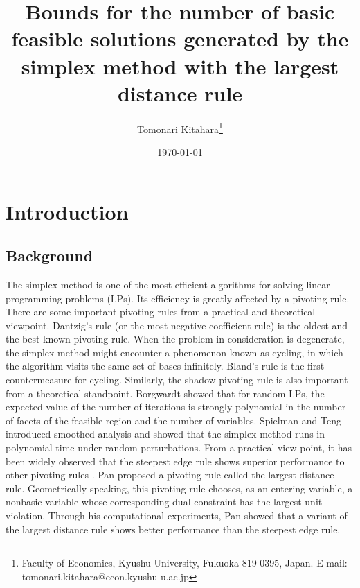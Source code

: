 \documentclass[12pt]{article}
\title{Bounds for the number of basic feasible solutions generated by the simplex method with the largest distance rule}
\author{Tomonari Kitahara\footnote{Faculty of Economics, Kyushu University, Fukuoka 819-0395, Japan. E-mail: tomonari.kitahara@econ.kyushu-u.ac.jp}}
\date{\today}
\begin{document}
\maketitle
{}
\section{Introduction}
\subsection{Background}
The simplex method is one of the most efficient algorithms for solving linear programming problems (LPs). 
Its efficiency is greatly affected by a pivoting rule. 
There are some important pivoting rules from a practical and theoretical viewpoint. 
Dantzig's rule (or the most negative coefficient rule) \cite{dantzig1963} is the oldest and the best-known pivoting rule. 
When the problem in consideration is degenerate, the simplex method might encounter a phenomenon known as cycling, in which the algorithm visits the same set of bases infinitely.
Bland's rule \cite{bland1977} is the first countermeasure for cycling. 
Similarly, the shadow pivoting rule is also important from a theoretical standpoint.
Borgwardt \cite{borgwardt1987} showed that for random LPs, the expected value of the number of iterations is strongly polynomial in 
the number of facets of the feasible region and the number of variables. 
Spielman and Teng \cite{spielman2004} introduced smoothed analysis and showed that the simplex method runs in polynomial time under random perturbations.
From a practical view point, it has been widely observed that the steepest edge rule shows superior performance to other pivoting rules \cite{matousek2007}.  
Pan \cite{pan2008} proposed a pivoting rule called the largest distance rule.
Geometrically speaking, this pivoting rule chooses, as an entering variable, a nonbasic variable whose corresponding dual constraint has the largest unit violation. 
Through his computational experiments, Pan \cite{pan2010} showed that a variant of the largest distance rule shows better performance than the steepest edge rule.\\
\end{document}
